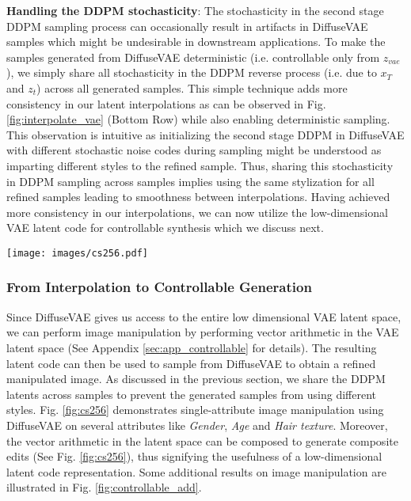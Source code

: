\documentclass[10pt]{article} \usepackage[accepted]{tmlr}
\begin{document}
\textbf{Handling the DDPM stochasticity}:
The stochasticity in the second stage DDPM sampling process can occasionally result in artifacts in DiffuseVAE samples which might be undesirable in downstream applications. To make the samples generated from DiffuseVAE deterministic (i.e. controllable only from $z_{vae}$), we simply share all stochasticity in the DDPM reverse process (i.e. due to $x_T$ and $z_t$) across all generated samples. This simple technique adds more consistency in our latent interpolations as can be observed in Fig. \ref{fig:interpolate_vae} (Bottom Row) while also enabling deterministic sampling. This observation is intuitive as initializing the second stage DDPM in DiffuseVAE with different stochastic noise codes during sampling might be understood as imparting different styles to the refined sample. Thus, sharing this stochasticity in DDPM sampling across samples implies using the same stylization for all refined samples leading to smoothness between interpolations. Having achieved more consistency in our interpolations, we can now utilize the low-dimensional VAE latent code for controllable synthesis which we discuss next.

\begin{figure*}
  \centering
    \texttt{[image: images/cs256.pdf]}
    \caption{Controllable generation on DiffuseVAE generated samples on the CelebA-HQ 256 dataset. Red and green arrows indicate vector subtract and addition operations respectively. Top and Bottom panels show single edits and composite edits respectively.}
    \label{fig:cs256}
\end{figure*}


\subsubsection{From Interpolation to Controllable Generation}
Since DiffuseVAE gives us access to the entire low dimensional VAE latent space, we can perform image manipulation by performing vector arithmetic in the VAE latent space (See Appendix \ref{sec:app_controllable} for details). The resulting latent code can then be used to sample from DiffuseVAE to obtain a refined manipulated image. As discussed in the previous section, we share the DDPM latents across samples to prevent the generated samples from using different styles. Fig. \ref{fig:cs256} demonstrates single-attribute image manipulation using DiffuseVAE on several attributes like \textit{Gender}, \textit{Age} and \textit{Hair texture}. Moreover, the vector arithmetic in the latent space can be composed to generate composite edits (See Fig. \ref{fig:cs256}), thus signifying the usefulness of a low-dimensional latent code representation. Some additional results on image manipulation are illustrated in Fig. \ref{fig:controllable_add}.
\end{document}
